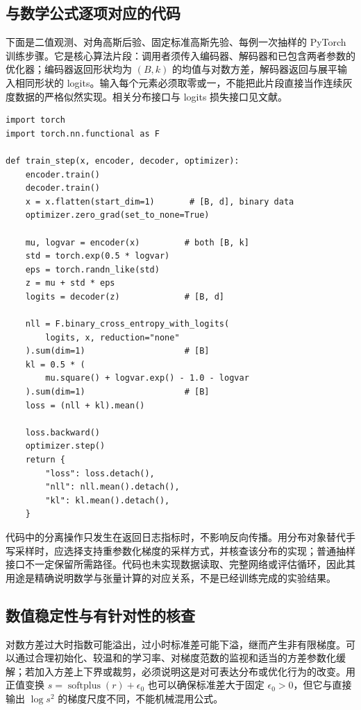 \documentclass[UTF8,12pt,a4paper,fontset=fandol]{ctexart}
\begin{document}
\subsection{与数学公式逐项对应的代码}
下面是二值观测、对角高斯后验、固定标准高斯先验、每例一次抽样的 PyTorch 训练步骤。它是核心算法片段：调用者须传入编码器、解码器和已包含两者参数的优化器；编码器返回形状均为 $(B,k)$ 的均值与对数方差，解码器返回与展平输入相同形状的 logits。输入每个元素必须取零或一，不能把此片段直接当作连续灰度数据的严格似然实现。相关分布接口与 logits 损失接口见文献\cite{pytorchdocs}。
\begin{verbatim}
import torch
import torch.nn.functional as F

def train_step(x, encoder, decoder, optimizer):
    encoder.train()
    decoder.train()
    x = x.flatten(start_dim=1)       # [B, d], binary data
    optimizer.zero_grad(set_to_none=True)

    mu, logvar = encoder(x)         # both [B, k]
    std = torch.exp(0.5 * logvar)
    eps = torch.randn_like(std)
    z = mu + std * eps
    logits = decoder(z)             # [B, d]

    nll = F.binary_cross_entropy_with_logits(
        logits, x, reduction="none"
    ).sum(dim=1)                    # [B]
    kl = 0.5 * (
        mu.square() + logvar.exp() - 1.0 - logvar
    ).sum(dim=1)                    # [B]
    loss = (nll + kl).mean()

    loss.backward()
    optimizer.step()
    return {
        "loss": loss.detach(),
        "nll": nll.mean().detach(),
        "kl": kl.mean().detach(),
    }
\end{verbatim}
代码中的分离操作只发生在返回日志指标时，不影响反向传播。用分布对象替代手写采样时，应选择支持重参数化梯度的采样方式，并核查该分布的实现；普通抽样接口不一定保留所需路径。代码也未实现数据读取、完整网络或评估循环，因此其用途是精确说明数学与张量计算的对应关系，不是已经训练完成的实验结果。

\subsection{数值稳定性与有针对性的核查}
对数方差过大时指数可能溢出，过小时标准差可能下溢，继而产生非有限梯度。可以通过合理初始化、较温和的学习率、对梯度范数的监视和适当的方差参数化缓解；若加入方差上下界或裁剪，必须说明这是对可表达分布或优化行为的改变。用正值变换 $s=\operatorname{softplus}(r)+\epsilon_0$ 也可以确保标准差大于固定 $\epsilon_0>0$，但它与直接输出 $\log s^2$ 的梯度尺度不同，不能机械混用公式。
\end{document}
